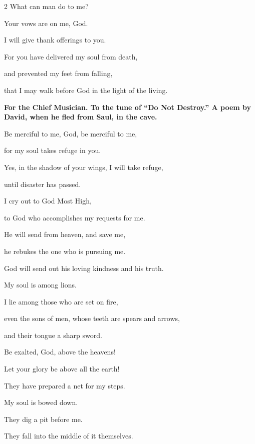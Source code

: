 \begin{multicols}{2}
	What can man do to me?
	
	
	\myverse{}Your vows are on me, God.
	
	I will give thank offerings to you.
	
	
	\myverse{}For you have delivered my soul from death,
	
	and prevented my feet from falling,
	
	that I may walk before God in the light of the living.
	
	
	\mychapter{}\textbf{For the Chief Musician. To the tune of “Do Not Destroy.” A poem by David, when he fled from
		Saul, in the cave.}
	
	\myverse*{}Be merciful to me, God, be merciful to me,
	
	for my soul takes refuge in you.
	
	Yes, in the shadow of your wings, I will take refuge,
	
	until disaster has passed.
	
	
	\myverse{}I cry out to God Most High,
	
	to God who accomplishes my requests for me.
	
	
	\myverse{}He will send from heaven, and save me,
	
	he rebukes the one who is pursuing me.
	
	\vspace{\baselineskip}	
	
	
	God will send out his loving kindness and his truth.
	
	
	\myverse{}My soul is among lions.
	
	I lie among those who are set on fire,
	
	even the sons of men, whose teeth are spears and arrows,
	
	and their tongue a sharp sword.
	
	
	\myverse{}Be exalted, God, above the heavens!
	
	Let your glory be above all the earth!
	
	\vspace{\baselineskip}	
	
	\myverse{}They have prepared a net for my steps.
	
	My soul is bowed down.
	
	They dig a pit before me.
	
	They fall into the middle of it themselves.
	
	\vspace{\baselineskip}	
	

\end{multicols}
